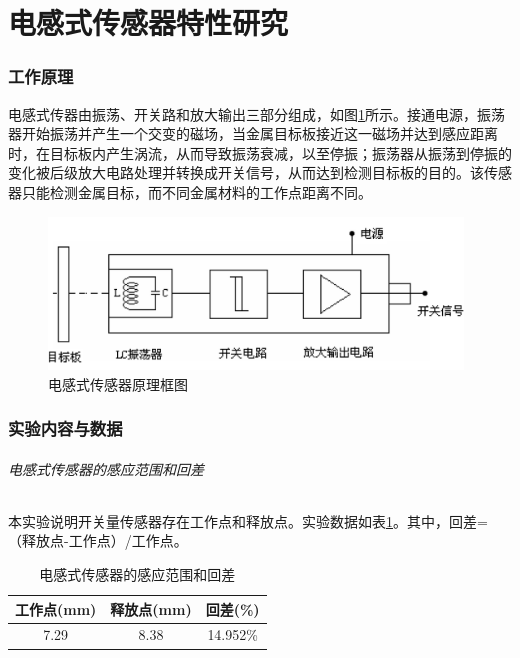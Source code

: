 \tableofcontents
\clearpage

\part{电感式传感器特性研究}
	\section{工作原理}
	电感式传器由振荡、开关路和放大输出三部分组成，如图\ref{fig:sp}所示。接通电源，振荡器开始振荡并产生一个交变的磁场，当金属目标板接近这一磁场并达到感应距离时，在目标板内产生涡流，从而导致振荡衰减，以至停振；振荡器从振荡到停振的变化被后级放大电路处理并转换成开关信号，从而达到检测目标板的目的。该传感器只能检测金属目标，而不同金属材料的工作点距离不同。
	\begin{figure}[htbp]
	\centering
	\includegraphics[width=11cm]{resource/principle.png}
	\caption{电感式传感器原理框图}
	\label{fig:sp}
	\end{figure}

	\section{实验内容与数据}
	\paragraph{电感式传感器的感应范围和回差} 本实验说明开关量传感器存在工作点和释放点。实验数据如表\ref{tab:srr}。其中，回差=（释放点-工作点）/工作点。
	\begin{table}[htbp]
		\centering
		\begin{tabular}{|c|c|c|}
			\hline
			工作点(mm) & 释放点(mm) & 回差(\%) \\
			\hline
			7.29 & 8.38 & 14.952\% \\
			\hline
		\end{tabular}
		\caption{电感式传感器的感应范围和回差}
		\label{tab:srr}
	\end{table}

